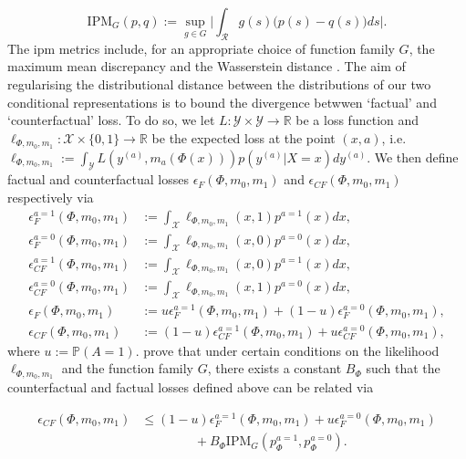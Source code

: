 \documentclass[../thesis.tex]{subfiles}
\begin{document}
\[ \mathrm{IPM}_G(p,q) := \sup_{g \in G} \Big| \int_{\mathcal{R}} g(s)\big(p(s)-q(s)\big)ds\Big|.\]
The \gls{ipm} metrics include, for an appropriate choice of function family $G$, the maximum mean discrepancy \citep{gretton_covariate_2008} and the Wasserstein distance \citep{villani_optimal_2009, sriperumbudur_empirical_2012, cuturi_sinkhorn_2013}. The aim of regularising the distributional distance between the distributions of our two conditional representations is to bound the divergence betwwen `factual' and `counterfactual' loss. To do so, we let $L \colon \mathcal{Y} \times \mathcal{Y} \rightarrow \mathbb{R}$ be a loss function and $\ell_{\Phi, m_0, m_1} \colon \mathcal{X} \times \{0,1\} \rightarrow \mathbb{R}$ be the expected loss at the point $(x,a)$, i.e. $\ell_{\Phi, m_0, m_1} := \int_\mathcal{Y} L(y^{(a)}, m_a(\Phi(x)))p(y^{(a)}|X=x)dy^{(a)}$. We then define factual and counterfactual losses $\epsilon_F(\Phi, m_0, m_1)$ and $\epsilon_{CF}(\Phi, m_0, m_1)$ respectively via
\begin{align*}
    \epsilon^{a=1}_F(\Phi, m_0, m_1) & := \int_{\mathcal{X}} \ell_{\Phi, m_0, m_1}(x, 1)p^{a=1}(x)dx, \\
    \epsilon^{a=0}_F(\Phi, m_0, m_1) & := \int_{\mathcal{X}} \ell_{\Phi, m_0, m_1}(x, 0)p^{a=0}(x)dx, \\
    \epsilon^{a=1}_{CF}(\Phi, m_0, m_1) & := \int_{\mathcal{X}} \ell_{\Phi, m_0, m_1}(x, 0)p^{a=1}(x)dx, \\
    \epsilon^{a=0}_{CF}(\Phi, m_0, m_1) & := \int_{\mathcal{X}} \ell_{\Phi, m_0, m_1}(x, 1)p^{a=0}(x)dx, \\
    \epsilon_F(\Phi, m_0, m_1) & := u \epsilon^{a=1}_{F}(\Phi, m_0, m_1)  + (1-u) \epsilon^{a=0}_{F}(\Phi, m_0, m_1), \\
    \epsilon_{CF}(\Phi, m_0, m_1) & := (1-u) \epsilon^{a=1}_{CF}(\Phi, m_0, m_1)  + u \epsilon^{a=0}_{CF}(\Phi, m_0, m_1), 
\end{align*}
where $u := \mathbb{P}(A=1)$. \citet{shalit_estimating_2017} prove that under certain conditions on the likelihood $\ell_{\Phi, m_0, m_1}$ and the function family $G$, there exists a constant $B_\Phi$ such that the counterfactual and factual losses defined above can be related via

\begin{align*}
    \epsilon_{CF}(\Phi, m_0, m_1)  & \leq (1-u)\epsilon_F^{a=1}(\Phi, m_0, m_1) + u\epsilon_F^{a=0}(\Phi, m_0, m_1) \\
& \hspace{50pt} + B_\Phi \mathrm{IPM}_G(p_{\Phi}^{a=1}, p_{\Phi}^{a=0}).
\end{align*} 
\end{document}
